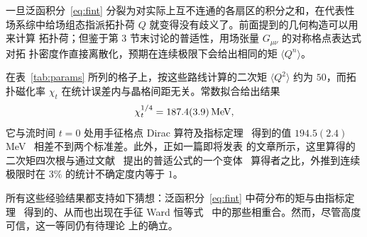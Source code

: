 一旦泛函积分~\eqref{eq:fint} 分裂为对实际上互不连通的各扇区的积分之和，在代表性
场系综中给场组态指派拓扑荷 $Q$ 就变得没有歧义了。前面提到的几何构造可以用来计算
拓扑荷；但鉴于第 3 节末讨论的普适性，用场张量 $G_{\mu\nu}$ 的对称格点表达式对拓
扑密度作直接离散化，预期在连续极限下会给出相同的矩 $\langle Q^n\rangle$。

在表~\ref{tab:params} 所列的格子上，按这些路线计算的二次矩 $\langle Q^2\rangle$
约为 $50$，而拓扑磁化率 $\chi_t$ 在统计误差内与晶格间距无关。常数拟合给出结果
\begin{equation}
   \chi_t^{1/4}=187.4(3.9)\,\mathrm{MeV},
   \label{eq:chit}
\end{equation}
它与流时间 $t=0$ 处用手征格点 Dirac 算符及指标定理~\cite{IndThm}
得到的值 $194.5(2.4)$ MeV~\cite{ChiGW} 相差不到两个标准差。此外，正如一篇即将发表
的文章所示，这里算得的二次矩四次根与通过文献~\cite{ChiInd}
提出的普适公式的一个变体~\cite{ChiProj} 算得者之比，外推到连续极限时在 $3\%$
的统计不确定度内等于 $1$。

所有这些经验结果都支持如下猜想：泛函积分~\eqref{eq:fint} 中荷分布的矩与由指标定
理~\cite{IndThm,ChiGW,ChiInd,ChiProj} 得到的、从而也出现在手征 Ward
恒等式~\cite{ChiWI,ChiWII} 中的那些相重合。然而，尽管高度可信，这一等同仍有待理论
上的确立。


